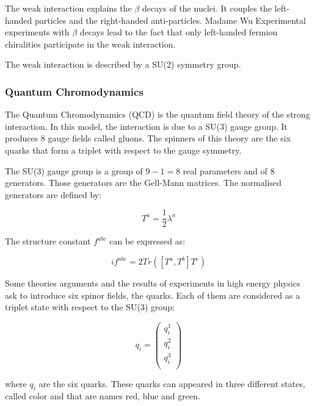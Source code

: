     The weak interaction explains the $\beta$ decays of the nuclei.
    It couples the left-handed particles and the right-handed anti-particles.
    Madame Wu
    Experimental experiments with $\beta$ decays lead to the fact that only left-handed fermion chiralities participate in the weak interaction.

    The weak interaction is described by a SU(2) symmetry group. 
    
    \subsubsection{Quantum Chromodynamics}
    
    The Quantum Chromodynamics (QCD) is the quantum field theory of the strong interaction.
    In this model, the interaction is due to a SU(3) gauge group. 
    It produces 8 gauge fields called gluons.
    The spinners of this theory are the six quarks that form a triplet with respect to the gauge symmetry.

    The SU(3) gauge group is a group of $9 - 1 = 8$ real parameters and of 8 generators. 
    Those generators are the Gell-Mann matrices. 
    The normalised generators are defined by: 
    
    \begin{equation}
        T^a = \frac{1}{2}\lambda^a
    \end{equation}

    The structure constant $f^{abc}$ can be expressed as:

    \begin{equation}
        if^{abc} = 2 Tr([T^a,T^b]T^c)
    \end{equation}
     
    Some theories arguments and the results of experiments in high energy physics ask to introduce six spinor fields, the quarks.
    Each of them are considered as a triplet state with respect to the SU(3) group:

    \begin{equation}
      q_i = 
        \begin{pmatrix}
          q_i^1 \\
          q_i^2 \\
          q_i^3 \\
        \end{pmatrix}
     \end{equation}
    
    where $q_i$ are the six quarks.
    These quarks can appeared in three different states, called color and that are names red, blue and green.

